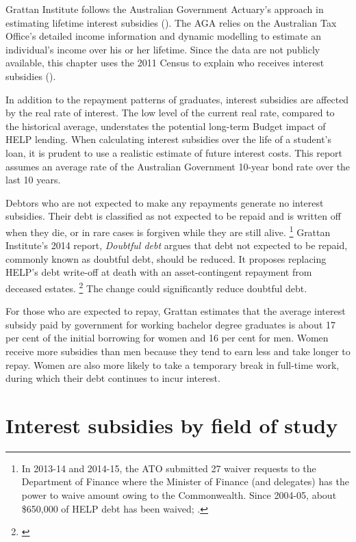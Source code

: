 \documentclass[embargoed]{grattan}
\begin{document}
Grattan Institute follows the Australian Government Actuary's approach in estimating lifetime interest subsidies ().
The \gls{AGA} relies on the Australian Tax Office's detailed income information and dynamic modelling to estimate an individual's income over his or her lifetime.
Since the data are not publicly available, this chapter uses the 2011 Census to explain who receives interest subsidies ().

In addition to the repayment patterns of graduates, interest subsidies are affected by the real rate of interest.
The low level of the current real rate, compared to the historical average, understates the potential long-term Budget impact of \gls{HELP} lending.
When calculating interest subsidies over the life of a student's loan, it is prudent to use a realistic estimate of future interest costs.
This report assumes an average rate of the Australian Government 10-year bond rate over the last 10 years.


Debtors who are not expected to make any repayments generate no interest subsidies.
Their debt is classified as not expected to be repaid and is written off when they die, or in rare cases is forgiven while they are still alive.%
\footnote{In 2013-14 and 2014-15, the \gls{ATO} submitted 27 waiver requests to the Department of Finance where the Minister of Finance (and delegates) has the power to waive amount owing to the Commonwealth.
Since 2004-05, about \$650,000 of \gls{HELP} debt has been waived; \textcite[][p. 38]{ANAO2016AdministrationHigherEducation}.} Grattan Institute's 2014 report, \emph{Doubtful debt} argues that debt not expected to be repaid, commonly known as doubtful debt, should be reduced.
It proposes replacing \gls{HELP}'s debt write-off at death with an asset-contingent repayment from deceased estates.%
\footnote{\textcite{Norton2014Doubtfuldebtrising}} The change could significantly reduce doubtful debt.

For those who are expected to repay, Grattan estimates that the average interest subsidy paid by government for working bachelor degree graduates is about 17 per cent of the initial borrowing for women and 16 per cent for men.
Women receive more subsidies than men because they tend to earn less and take longer to repay.
Women are also more likely to take a temporary break in full-time work, during which their debt continues to incur interest.

\section{Interest subsidies by field of study}\label{interest-subsidies-by-field-of-study}
\end{document}
